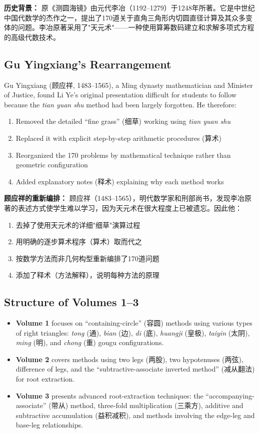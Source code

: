 \documentclass[11pt,a4paper]{article}
\newcounter{problem}[section]
\begin{document}
\textbf{历史背景：} 原《测圆海镜》由元代李冶（1192--1279）于1248年所著。它是中世纪中国代数学的杰作之一，提出了170道关于直角三角形内切圆直径计算及其众多变体的问题。李冶原著采用了"天元术"——一种使用算筹数码建立和求解多项式方程的高级代数技术。

\subsection*{Gu Yingxiang's Rearrangement}
Gu Yingxiang (顾应祥, 1483--1565), a Ming dynasty mathematician and Minister of Justice, found Li Ye's original presentation difficult for students to follow because the \textit{tian yuan shu} method had been largely forgotten. He therefore:
\begin{enumerate}
\item Removed the detailed ``fine grass'' (细草) working using \textit{tian yuan shu}
\item Replaced it with explicit step-by-step arithmetic procedures (算术)
\item Reorganized the 170 problems by mathematical technique rather than geometric configuration
\item Added explanatory notes (释术) explaining why each method works
\end{enumerate}

\textbf{顾应祥的重新编排：} 顾应祥（1483--1565），明代数学家和刑部尚书，发现李冶原著的表述方式使学生难以学习，因为天元术在很大程度上已被遗忘。因此他：
\begin{enumerate}
\item 去掉了使用天元术的详细"细草"演算过程
\item 用明确的逐步算术程序（算术）取而代之
\item 按数学方法而非几何构型重新编排了170道问题
\item 添加了释术（方法解释），说明每种方法的原理
\end{enumerate}

\subsection*{Structure of Volumes 1--3}
\begin{itemize}
\item \textbf{Volume 1} focuses on ``containing-circle'' (容圆) methods using various types of right triangles: \textit{tong} (通), \textit{bian} (边), \textit{di} (底), \textit{huangji} (皇极), \textit{taiyin} (太阴), \textit{ming} (明), and \textit{chong} (重) gougu configurations.
\item \textbf{Volume 2} covers methods using two legs (两股), two hypotenuses (两弦), difference of legs, and the ``subtractive-associate inverted method'' (减从翻法) for root extraction.
\item \textbf{Volume 3} presents advanced root-extraction techniques: the ``accompanying-associate'' (带从) method, three-fold multiplication (三乘方), additive and subtractive accumulation (益积减积), and methods involving the edge-leg and base-leg relationships.
\end{itemize}
\end{document}
